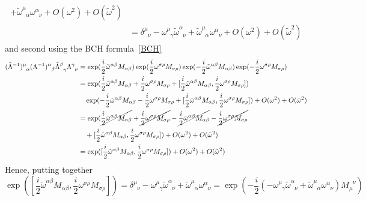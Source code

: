 \begin{equation*}
\begin{aligned}
+ \tilde \omega^{\mu}_{\phantom \mu \alpha} \omega^{\alpha}_{\phantom \alpha \nu} + O(\omega^2) + O(\tilde \omega^2) \\ & = \delta^{\mu}_{\phantom \mu \nu} - \omega^{\mu}_{\phantom \mu \gamma} \tilde \omega^{\alpha}_{\phantom \alpha \nu} + \tilde \omega^{\mu}_{\phantom \mu \alpha} \omega^{\alpha}_{\phantom \alpha \nu} + O(\omega^2) + O(\tilde \omega^2)
    \end{aligned}
    \end{equation*}
    and second using the BCH formula~\eqref{BCH}
    \begin{equation*}
    \begin{aligned}
        (\tilde \Lambda^{-1})^{\mu}_{\phantom \mu \alpha} (\Lambda^{-1})^{\alpha}_{\phantom \alpha \beta} \tilde \Lambda^{\beta}_{\phantom \beta \gamma} \Lambda^{\gamma}_{\phantom \gamma \nu} & = \exp(\frac{i}{2} \tilde \omega^{\alpha \beta} M_{\alpha \beta}) \exp(\frac{i}{2} \omega^{\sigma \rho} M_{\sigma \rho}) \exp(- \frac{i}{2} \tilde \omega^{\alpha \beta} M_{\alpha \beta}) \exp(- \frac{i}{2} \omega^{\sigma \rho} M_{\sigma \rho}) \\ & = \exp(\frac{i}{2} \tilde \omega^{\alpha \beta} M_{\alpha \beta} + \frac{i}{2} \omega^{\sigma \rho} M_{\sigma \rho} + [\frac{i}{2} \tilde \omega^{\alpha \beta} M_{\alpha \beta}, \frac{i}{2} \omega^{\sigma \rho} M_{\sigma \rho}]) \\ & \quad \exp(- \frac{i}{2} \tilde \omega^{\alpha \beta} M_{\alpha \beta} - \frac{i}{2} \omega^{\sigma \rho} M_{\sigma \rho} + [\frac{i}{2} \tilde \omega^{\alpha \beta} M_{\alpha \beta}, \frac{i}{2} \omega^{\sigma \rho} M_{\sigma \rho}]) + O(\omega^2) + O(\tilde \omega^2) \\ & =  \exp(\cancel{\frac{i}{2} \tilde \omega^{\alpha \beta} M_{\alpha \beta}} + \cancel{\frac{i}{2} \omega^{\sigma \rho} M_{\sigma \rho}} - \cancel{\frac{i}{2} \tilde \omega^{\alpha \beta} M_{\alpha \beta}} - \cancel{\frac{i}{2} \omega^{\sigma \rho} M_{\sigma \rho}} \\ & \quad + [\frac{i}{2} \tilde \omega^{\alpha \beta} M_{\alpha \beta}, \frac{i}{2} \omega^{\sigma \rho} M_{\sigma \rho}]) + O(\omega^2) + O(\tilde \omega^2) \\ & = \exp([\frac{i}{2} \tilde \omega^{\alpha \beta} M_{\alpha \beta}, \frac{i}{2} \omega^{\sigma \rho} M_{\sigma \rho}]) + O(\omega^2) + O(\tilde \omega^2)
    \end{aligned}
    \end{equation*}
    Hence, putting together
    \begin{equation*}
        \exp([\frac{i}{2} \tilde \omega^{\alpha \beta} M_{\alpha \beta}, \frac{i}{2} \omega^{\sigma \rho} M_{\sigma \rho}]) = \delta^{\mu}_{\phantom \mu \nu} - \omega^{\mu}_{\phantom \mu \gamma} \tilde \omega^{\alpha}_{\phantom \alpha \nu} + \tilde \omega^{\mu}_{\phantom \mu \alpha} \omega^{\alpha}_{\phantom \alpha \nu} = \exp(-\frac{i}{2} (-\omega^{\mu}_{\phantom \mu \gamma} \tilde \omega^{\alpha}_{\phantom \alpha \nu} + \tilde \omega^{\mu}_{\phantom \mu \alpha} \omega^{\alpha}_{\phantom \alpha \nu}) M_\mu^{\phantom \mu\nu})
    \end{equation*}
